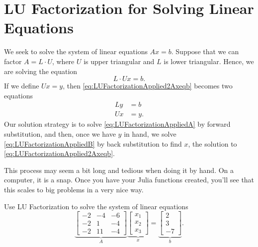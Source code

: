 \Qed

\section{LU Factorization for Solving Linear Equations}
\label{sec:LUsolveAxEqB}

\begin{tcolorbox}[title=\Large \textbf{Solving $\mathbf{Ax=b}$ \textcolor{red}{\bf via LU} without \textcolor{red}{\bf Row Permutations}}]
We seek to solve the system of linear equations $Ax=b$. Suppose that we can factor $A=L \cdot U$, where $U$ is upper triangular and $L$ is lower triangular. Hence, we are solving the equation
\begin{equation}
\label{eq:LUFactorizationApplied2Axeqb}
  L \cdot U x = b.  
\end{equation} 
If we define $Ux=y$, then \eqref{eq:LUFactorizationApplied2Axeqb} becomes two equations
\begin{align}
  \label{eq:LUFactorizationAppliedA}
  L y &= b \\
    \label{eq:LUFactorizationAppliedB}
 U x &=y.
\end{align}
Our solution strategy is to solve \eqref{eq:LUFactorizationAppliedA} by forward substitution, and then, once we have $y$ in hand, we solve \eqref{eq:LUFactorizationAppliedB}
by back substitution to find $x$, the solution to \eqref{eq:LUFactorizationApplied2Axeqb}.
\end{tcolorbox}

\begin{tcolorbox}[sharp corners, colback=green!30, colframe=green!80!blue, title=\textbf{\large Major Important Fact}]  This process may seem a bit long and tedious when doing it by hand. On a computer, it is a snap. Once you have your Julia functions created, you'll see that this scales to big problems in a very nice way.
\end{tcolorbox}
\vspace*{1cm}

\begin{example}
\label{ex:SolveUsingLu01} 
Use LU Factorization to solve the system of linear equations
\begin{equation}
    \label{eq:Chap5pt4A}
\underbrace{\left[\begin{array}{rrr} -2 & -4 & -6\\
-2 & 1 & -4 \\ -2 & 11 & -4 \end{array}\right]}_{A}  \underbrace{\left[\begin{array}{r} x_1\\
x_2 \\ x_3\end{array}\right]}_{x} 
= \underbrace{\left[\begin{array}{r} 2\\
3 \\ -7 \end{array}\right]}_{b}. 
\end{equation}
\end{example}

